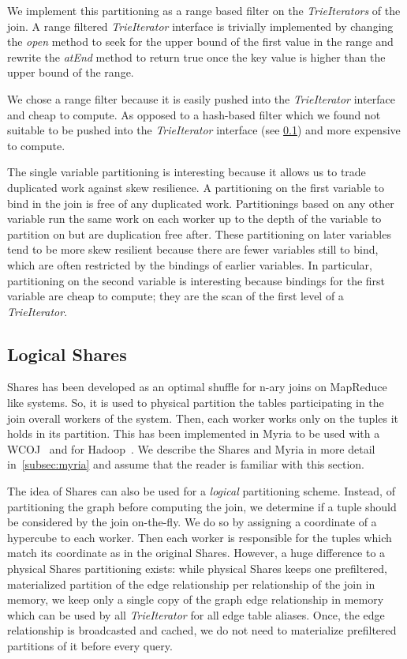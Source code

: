We implement this partitioning as a range based filter on the \textit{TrieIterators} of the join.
A range filtered \textit{TrieIterator} interface is trivially implemented by changing the \textit{open} method to seek
for the upper bound of the first value in the range and rewrite the \textit{atEnd} method to return true once the key
value is higher than the upper bound of the range.

We chose a range filter because it is easily pushed into the \textit{TrieIterator} interface and cheap to compute.
As opposed to a hash-based filter which we found not suitable to be pushed into the \textit{TrieIterator} interface (see
\cref{subsec:shares-logical}) and more expensive to compute.

The single variable partitioning is interesting because it allows us to trade duplicated work against skew resilience.
A partitioning on the first variable to bind in the join is free of any duplicated work.
Partitionings based on any other variable run the same work on each worker up to the depth of the variable to partition on but
are duplication free after.
These partitioning on later variables tend to be more skew resilient because there are fewer variables still to bind, which are often
restricted by the bindings of earlier variables.
In particular, partitioning on the second variable is interesting because bindings for the first variable are cheap to compute;
they are the scan of the first level of a \textit{TrieIterator}.

\subsection{Logical Shares} \label{subsec:shares-logical}
Shares has been developed as an optimal shuffle for n-ary joins on MapReduce like systems.
So, it is used to physical partition the tables participating in the join overall workers of the system.
Then, each worker works only on the tuples it holds in its partition.
This has been implemented in Myria to be used with a \textsc{WCOJ}~\cite{myria-detailed} and for Hadoop~\cite{hadoop}.
We describe the Shares and Myria in more detail in~\cref{subsec:myria} and assume that the reader is familiar
with this section.

The idea of Shares can also be used for a \textit{logical} partitioning scheme.
Instead, of partitioning the graph before computing the join, we determine if a tuple should be considered by the
join on-the-fly.
We do so by assigning a coordinate of a hypercube to each worker.
Then each worker is responsible for the tuples which match its coordinate as in the original Shares.
However, a huge difference to a physical Shares partitioning exists: while physical Shares keeps one prefiltered, materialized
partition of the edge relationship per relationship of the join in memory, we keep only a single copy of the graph edge relationship in
memory which can be used by all \textit{TrieIterator} for all edge table aliases.
Once, the edge relationship is broadcasted and cached, we do not need to materialize prefiltered partitions of it before every
query.

